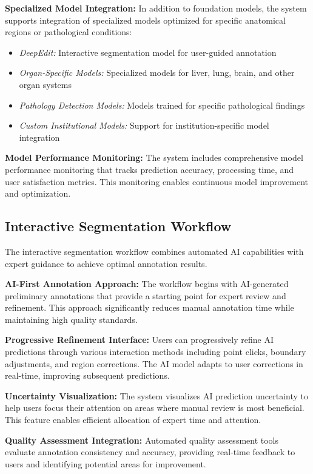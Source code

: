 \textbf{Specialized Model Integration:} In addition to foundation models, the system supports integration of specialized models optimized for specific anatomical regions or pathological conditions:

\begin{itemize}
    \item \textit{DeepEdit:} Interactive segmentation model for user-guided annotation
    \item \textit{Organ-Specific Models:} Specialized models for liver, lung, brain, and other organ systems
    \item \textit{Pathology Detection Models:} Models trained for specific pathological findings
    \item \textit{Custom Institutional Models:} Support for institution-specific model integration
\end{itemize}

\textbf{Model Performance Monitoring:} The system includes comprehensive model performance monitoring that tracks prediction accuracy, processing time, and user satisfaction metrics. This monitoring enables continuous model improvement and optimization.

\subsection{Interactive Segmentation Workflow}

The interactive segmentation workflow combines automated AI capabilities with expert guidance to achieve optimal annotation results.

\textbf{AI-First Annotation Approach:} The workflow begins with AI-generated preliminary annotations that provide a starting point for expert review and refinement. This approach significantly reduces manual annotation time while maintaining high quality standards.

\textbf{Progressive Refinement Interface:} Users can progressively refine AI predictions through various interaction methods including point clicks, boundary adjustments, and region corrections. The AI model adapts to user corrections in real-time, improving subsequent predictions.

\textbf{Uncertainty Visualization:} The system visualizes AI prediction uncertainty to help users focus their attention on areas where manual review is most beneficial. This feature enables efficient allocation of expert time and attention.

\textbf{Quality Assessment Integration:} Automated quality assessment tools evaluate annotation consistency and accuracy, providing real-time feedback to users and identifying potential areas for improvement.

